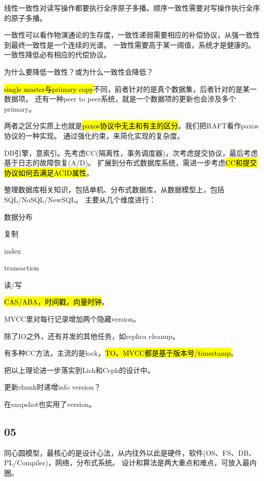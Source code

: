 线性一致性对读写操作都要执行全序原子多播。顺序一致性需要对写操作执行全序的原子多播。

一致性可以看作物演通论的生存度，一致性递弱需要相应的补偿协议，从强一致性到最终一致性是一个连续的光谱。
一致性需要高于某一阈值，系统才是健康的。一致性降低必有相应的代偿协议。

为什么要降低一致性？或为什么一致性会降低？

\hl{single master与primary copy}不同，前者针对的是真个数据集，后者针对的是某一数据项。
还有一种peer to peer系统，就是一个数据项的更新也会涉及多个primary。

两者之区分实质上也就是\hl{paxos协议中无主和有主的区分}。我们把RAFT看作paxos协议的一种实现。
通过强化约束，来简化实现的复杂度。

\hrulefill

DB引擎，意索引。先考虑CC(隔离性，事务调度器)，次考虑提交协议，最后考虑基于日志的故障恢复(A/D)。
扩展到分布式数据库系统，需进一步考虑\hl{CC和提交协议如何去满足ACID属性}。

整理数据库相关知识，包括单机、分布式数据库，从数据模型上，包括SQL/NoSQL/NewSQL。
主要从几个维度进行：
\begin{enumbox}
\item 数据分布
\item 复制
\item index
\item transaction
\item 读/写
\end{enumbox}

\hrulefill

\hl{CAS/ABA，时间戳，向量时钟}。

MVCC里对每行记录增加两个隐藏version。

除了IO之外，还有并发的其他任务，如replica cleanup。

有多种CC方法，主流的是lock，\hl{TO、MVCC都是基于版本号/timestamp}。

\hrulefill

把以上理论进一步落实到Lich和Ceph的设计中。
\begin{enumbox}
\item 更新chunk时递增info version？
\item 在snapshot也实用了version。
\end{enumbox}

\subsection{05}

同心圆模型，最核心的是设计心法，从内往外以此是硬件，软件(OS、FS、DB、PL/Compiler)，网络，分布式系统。
设计和算法是两大重点和难点，可放入最内圈。

